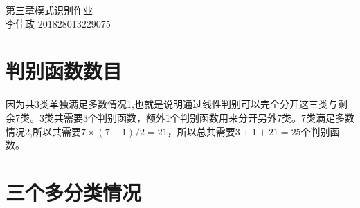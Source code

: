\documentclass{article}
\begin{document}
\begin{CJK*}{UTF8}{gbsn}

    \begin{center}
        \textsc{\LARGE 第三章模式识别作业}\\[1.5cm]
        \textsc{\LARGE 李佳政 201828013229075}\\[1.cm]
    \end{center}

    \setlength\parindent{0em}   
    \section{判别函数数目}

    因为共3类单独满足多数情况1,也就是说明通过线性判别可以完全分开这三类与剩余7类。3类共需要3个判别函数，额外1个判别函数用来分开另外7类。7类满足多数情况2,所以共需要$7\times(7-1)/2=21$，所以总共需要$3+1+21=25$个判别函数。
    
    \section{三个多分类情况}

    \begin{figure}[htbp]
        \centering
        \end{figure}





\end{CJK*}
\end{document}
